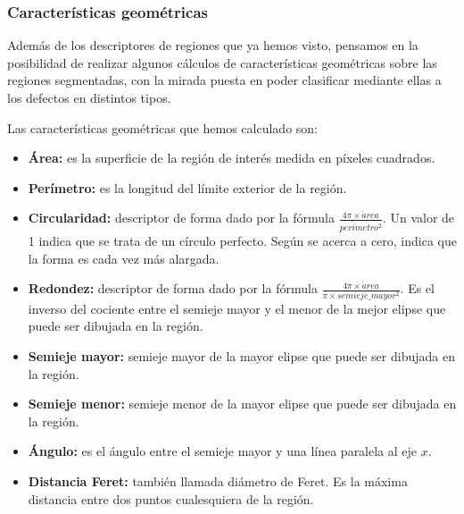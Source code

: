 




\subsubsection{Características geométricas}
Además de los descriptores de regiones que ya hemos visto, pensamos en la posibilidad de realizar algunos cálculos de características geométricas sobre las regiones segmentadas, con la mirada puesta en poder clasificar mediante ellas a los defectos en distintos tipos.

Las características geométricas que hemos calculado son:

\begin{itemize}

\item \textbf{Área:} es la superficie de la región de interés medida en píxeles cuadrados.

\item \textbf{Perímetro:} es la longitud del límite exterior de la región.

\item \textbf{Circularidad:} descriptor de forma dado por la fórmula $\frac{4\pi \times \acute{a}rea}{per\acute{i}metro^2}$. Un valor de 1 indica que se trata de un círculo perfecto. Según se acerca a cero, indica que la forma es cada vez más alargada.

\item \textbf{Redondez:} descriptor de forma dado por la fórmula $\frac{4\pi\times \acute{a}rea}{\pi \times semieje\_mayor^2}$. Es el inverso del cociente entre el semieje mayor y el menor de la mejor elipse que puede ser dibujada en la región.

\item \textbf{Semieje mayor:} semieje mayor de la mayor elipse que puede ser dibujada en la región.

\item \textbf{Semieje menor:} semieje menor de la mayor elipse que puede ser dibujada en la región.

\item \textbf{Ángulo:} es el ángulo entre el semieje mayor y una línea paralela al eje $x$.

\item \textbf{Distancia Feret:} también llamada diámetro de Feret. Es la máxima distancia entre dos puntos cualesquiera de la región.

\end{itemize}




